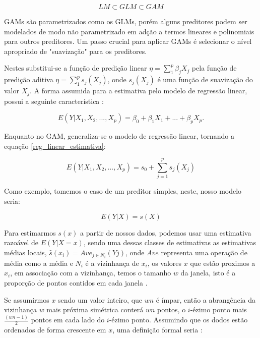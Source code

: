 \documentclass[
    12pt,               %
    openright,          %
    oneside,            %
    a4paper,            %
    english,            %
    brazil              %
    ]{abntex2}
\begin{document}
\begin{equation}
    LM \subset GLM \subset GAM
\end{equation}

GAMs são parametrizados como os GLMs, porém alguns preditores podem ser modelados de modo não parametrizado em 
adção a termos lineares e polinomiais para outros preditores. Um passo crucial para aplicar GAMs é selecionar
o nível apropriado de "suavização" para os preditores.

Nestes substitui-se a função de predição linear $\eta = \sum_{1}^{p}\beta_jX_j$ pela função de predição aditiva 
$\eta = \sum_{1}^{p}s_j(X_j)$, onde $s_j(X_j)$ é uma função de suavização do valor $X_j$. A forma assumida
para a estimativa pelo modelo de regressão linear, possui a seguinte característica \cite{GAM}:

\begin{equation}
    \label{reg_linear_estimativa}
    E(Y|X_1,X_2,...,X_p) = \beta_0 + \beta_1X_1 + ... + \beta_pX_p.
\end{equation}

Enquanto no GAM, generaliza-se o modelo de regressão linear, tornando a equação \ref{reg_linear_estimativa}:

\begin{equation}
    \label{reg_linear_generalizada}
    E(Y|X_1,X_2,...,X_p) = s_0 + \sum_{j=1}^{p} s_j(X_j)
\end{equation}

Como exemplo, tomemos o caso de um preditor simples, neste, nosso modelo seria:

\begin{equation}
    \label{preditor_simples}
    E(Y|X) = s(X)
\end{equation}

Para estimarmos $s(x)$ a partir de nossos dados, podemos usar uma estimativa razoável de $E(Y|X=x)$, sendo uma dessas 
classes de estimativas as estimativas médias locais, $\hat{s}(x_i) = Ave_{j \in N_i}(Yj)$, onde $Ave$ representa uma
operação de média como a média e $N_i$ é a vizinhança de $x_i$, os valores $x$ que estão proximos a $x_i$, em
associação com a vizinhança, temos o tamanho $w$ da janela, isto é a proporção de pontos contidos em cada janela \cite{GAM}.

Se assumirmos $x$ sendo um valor inteiro, que $wn$ é ímpar, então a abrangência da vizinhança $w$ mais próxima simétrica conterá
$wn$ pontos, o $i$-ézimo ponto mais $\frac{(wn - 1)}{2}$ pontos em cada lado do $i$-ézimo ponto. Assumindo que os dodos
estão ordenados de forma crescente em $x$, uma definição formal seria \cite{GAM}:
\end{document}
